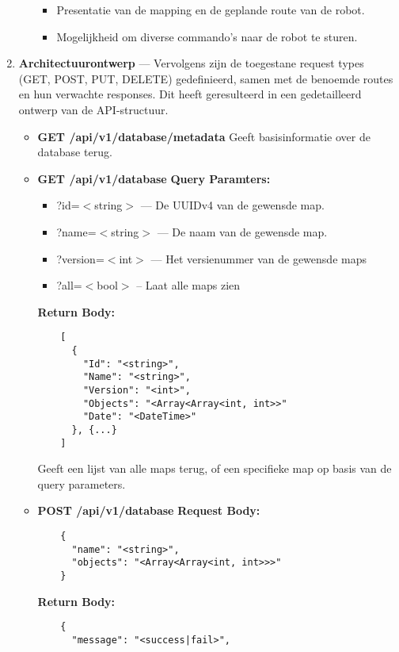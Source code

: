 \begin{enumerate}
\begin{enumerate}
\begin{itemize}
      \item Presentatie van de mapping en de geplande route van de robot.
      \item Mogelijkheid om diverse commando’s naar de robot te sturen.
    \end{itemize}
  \end{enumerate}
  \item \textbf{Architectuurontwerp} --- Vervolgens zijn de toegestane request types (GET, POST, PUT, DELETE) gedefinieerd, samen met de benoemde routes en hun verwachte responses. Dit heeft geresulteerd in een gedetailleerd ontwerp van de API-structuur.
  \begin{itemize}
    \item \textbf{GET /api/v1/database/metadata}
    \linebreak Geeft basisinformatie over de database terug.
    \item \textbf{GET /api/v1/database}
    \linebreak \textbf{Query Paramters:}
    \begin{itemize}
      \item ?id=$<$string$>$ --- De UUIDv4 van de gewensde map.
      \item ?name=$<$string$>$ --- De naam van de gewensde map.
      \item ?version=$<$int$>$ --- Het versienummer van de gewensde maps
      \item ?all=$<$bool$>$ -- Laat alle maps zien
    \end{itemize}
    \textbf{Return Body:}
    \begin{verbatim}
    [
      {
        "Id": "<string>",
        "Name": "<string>",
        "Version": "<int>",
        "Objects": "<Array<Array<int, int>>"
        "Date": "<DateTime>"
      }, {...}
    ]
    \end{verbatim}
    Geeft een lijst van alle maps terug, of een specifieke map op basis van de query parameters.
    \item \textbf{POST /api/v1/database}
    \linebreak \textbf{Request Body:}
    \begin{verbatim}
    {
      "name": "<string>",
      "objects": "<Array<Array<int, int>>>"
    }
    \end{verbatim}
    \textbf{Return Body:}
    \begin{verbatim}
    {
      "message": "<success|fail>",

\end{verbatim}
\end{itemize}
\end{enumerate}
